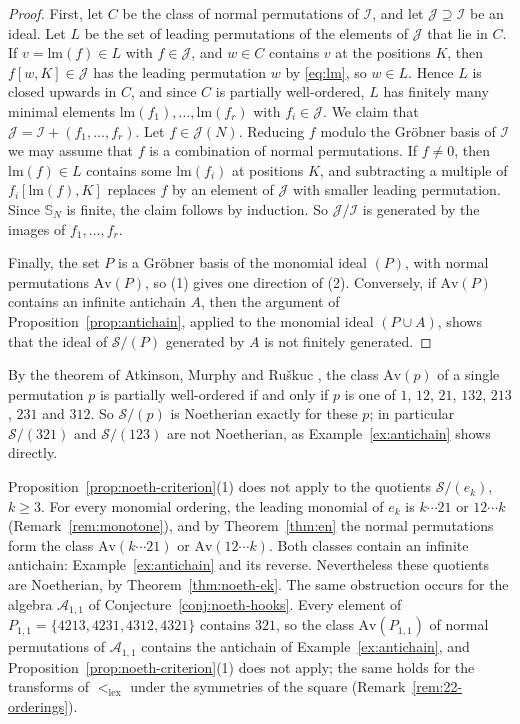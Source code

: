 \documentclass[11pt]{amsart}
\theoremstyle{definition}
\theoremstyle{remark}
\newcommand{\bS}{\mathbb{S}}
\newcommand{\lm}{\mathrm{lm}}
\newcommand{\cA}{\mathscr{A}}
\newcommand{\cI}{\mathscr{I}}
\newcommand{\cJ}{\mathscr{J}}
\newcommand{\cS}{\mathscr{S}}
\newcommand{\Av}{\mathrm{Av}}
\newcommand{\lex}{\mathrm{lex}}
\begin{document}
\begin{proof}
First, let $C$ be the class of normal permutations of $\cI$, and let $\cJ\supseteq\cI$ be an ideal. Let $L$ be the set of leading permutations of the elements of $\cJ$ that lie in $C$. If $v=\lm(f)\in L$ with $f\in\cJ$, and $w\in C$ contains $v$ at the positions $K$, then $f[w,K]\in\cJ$ has the leading permutation $w$ by \eqref{eq:lm}, so $w\in L$. Hence $L$ is closed upwards in $C$, and since $C$ is partially well-ordered, $L$ has finitely many minimal elements $\lm(f_1),\dots,\lm(f_r)$ with $f_i\in\cJ$. We claim that $\cJ=\cI+(f_1,\dots,f_r)$. Let $f\in\cJ(N)$. Reducing $f$ modulo the Gr\"obner basis of $\cI$ we may assume that $f$ is a combination of normal permutations. If $f\ne0$, then $\lm(f)\in L$ contains some $\lm(f_i)$ at positions $K$, and subtracting a multiple of $f_i[\lm(f),K]$ replaces $f$ by an element of $\cJ$ with smaller leading permutation. Since $\bS_N$ is finite, the claim follows by induction. So $\cJ/\cI$ is generated by the images of $f_1,\dots,f_r$.

Finally, the set $P$ is a Gr\"obner basis of the monomial ideal $(P)$, with normal permutations $\Av(P)$, so (1) gives one direction of (2). Conversely, if $\Av(P)$ contains an infinite antichain $A$, then the argument of Proposition~\ref{prop:antichain}, applied to the monomial ideal $(P\cup A)$, shows that the ideal of $\cS/(P)$ generated by $A$ is not finitely generated.
\end{proof}

By the theorem of Atkinson, Murphy and Ru\v{s}kuc \cite{AMR}, the class $\Av(p)$ of a single permutation $p$ is partially well-ordered if and only if $p$ is one of $1$, $12$, $21$, $132$, $213$, $231$ and $312$. So $\cS/(p)$ is Noetherian exactly for these $p$; in particular $\cS/(321)$ and $\cS/(123)$ are not Noetherian, as Example~\ref{ex:antichain} shows directly.

Proposition~\ref{prop:noeth-criterion}(1) does not apply to the quotients $\cS/(e_k)$, $k\ge3$. For every monomial ordering, the leading monomial of $e_k$ is $k\cdots21$ or $12\cdots k$ (Remark~\ref{rem:monotone}), and by Theorem~\ref{thm:en} the normal permutations form the class $\Av(k\cdots21)$ or $\Av(12\cdots k)$. Both classes contain an infinite antichain: Example~\ref{ex:antichain} and its reverse. Nevertheless these quotients are Noetherian, by Theorem~\ref{thm:noeth-ek}. The same obstruction occurs for the algebra $\cA_{1,1}$ of Conjecture~\ref{conj:noeth-hooks}. Every element of $P_{1,1}=\{4213,4231,4312,4321\}$ contains $321$, so the class $\Av(P_{1,1})$ of normal permutations of $\cA_{1,1}$ contains the antichain of Example~\ref{ex:antichain}, and Proposition~\ref{prop:noeth-criterion}(1) does not apply; the same holds for the transforms of $<_\lex$ under the symmetries of the square (Remark~\ref{rem:22-orderings}).
\end{document}
